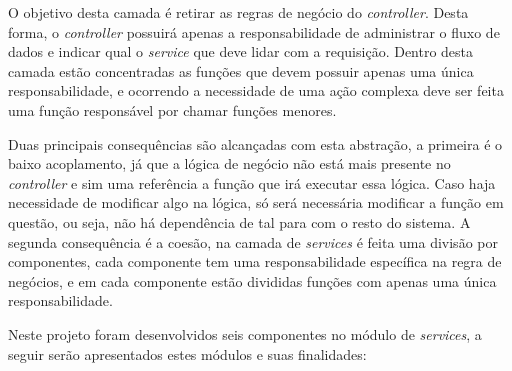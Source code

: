 O objetivo desta camada é retirar as regras de negócio do \textit{controller}. Desta forma, o \textit{controller} possuirá apenas a responsabilidade de administrar o fluxo de dados e indicar qual o \textit{service} que deve lidar com a requisição. Dentro desta camada estão concentradas as funções que devem possuir apenas uma única responsabilidade, e ocorrendo a necessidade de uma ação complexa deve ser feita uma função responsável por chamar funções menores.

Duas principais consequências são alcançadas com esta abstração, a primeira é o baixo acoplamento, já que a lógica de negócio não está mais presente no \textit{controller} e sim uma referência a função que irá executar essa lógica. Caso haja necessidade de modificar algo na lógica, só será necessária modificar a função em questão, ou seja, não há dependência de tal para com o resto do sistema. A segunda consequência é a coesão, na camada de \textit{services} é feita uma divisão por componentes, cada componente tem uma responsabilidade específica na regra de negócios, e em cada componente estão divididas funções com apenas uma única responsabilidade.

Neste projeto foram desenvolvidos seis componentes no módulo de \textit{services}, a seguir serão apresentados estes módulos e suas finalidades:

